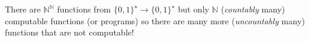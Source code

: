 There are  $\mathbb{N}^\mathbb{N}$ functions from   $\{0,1\}^\star\to \{0,1\}^\star$ 
but only $\mathbb{N}$ (\emph{countably} many) computable functions (or programs)
so there are many more (\emph{uncountably} many) functions that are not computable!
